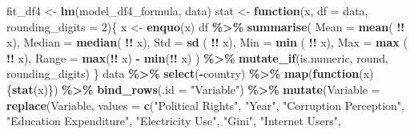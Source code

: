 \documentclass[
  english,
  man,floatsintext]{apa6}
\newenvironment{Shaded}{\begin{snugshade}}{\end{snugshade}}
\newcommand{\ControlFlowTok}[1]{\textcolor[rgb]{0.13,0.29,0.53}{\textbf{#1}}}
\newcommand{\DataTypeTok}[1]{\textcolor[rgb]{0.13,0.29,0.53}{#1}}
\newcommand{\DecValTok}[1]{\textcolor[rgb]{0.00,0.00,0.81}{#1}}
\newcommand{\KeywordTok}[1]{\textcolor[rgb]{0.13,0.29,0.53}{\textbf{#1}}}
\newcommand{\NormalTok}[1]{#1}
\newcommand{\OperatorTok}[1]{\textcolor[rgb]{0.81,0.36,0.00}{\textbf{#1}}}
\newcommand{\StringTok}[1]{\textcolor[rgb]{0.31,0.60,0.02}{#1}}
\begin{document}
\begin{Shaded}
\begin{Highlighting}[]
\NormalTok{fit\_df4 \textless{}{-}}\StringTok{ }\KeywordTok{lm}\NormalTok{(model\_df4\_formula, data)}
\NormalTok{stat \textless{}{-}}\StringTok{ }\ControlFlowTok{function}\NormalTok{(x, }\DataTypeTok{df =}\NormalTok{ data, }\DataTypeTok{rounding\_digits =} \DecValTok{2}\NormalTok{)\{}
\NormalTok{    x \textless{}{-}}\StringTok{ }\KeywordTok{enquo}\NormalTok{(x)}
\NormalTok{    df }\OperatorTok{\%\textgreater{}\%}
\StringTok{      }\KeywordTok{summarise}\NormalTok{(}
                       \DataTypeTok{Mean  =} \KeywordTok{mean}\NormalTok{( }\OperatorTok{!!}\StringTok{ }\NormalTok{x),}
                     \DataTypeTok{Median  =} \KeywordTok{median}\NormalTok{( }\OperatorTok{!!}\StringTok{ }\NormalTok{x),}
                         \DataTypeTok{Std =} \KeywordTok{sd}\NormalTok{  ( }\OperatorTok{!!}\StringTok{ }\NormalTok{x),}
                         \DataTypeTok{Min =} \KeywordTok{min}\NormalTok{ ( }\OperatorTok{!!}\StringTok{ }\NormalTok{x),}
                         \DataTypeTok{Max =} \KeywordTok{max}\NormalTok{ ( }\OperatorTok{!!}\StringTok{ }\NormalTok{x),}
                       \DataTypeTok{Range =} \KeywordTok{max}\NormalTok{(}\OperatorTok{!!}\StringTok{ }\NormalTok{x) }\OperatorTok{{-}}\StringTok{ }\KeywordTok{min}\NormalTok{(}\OperatorTok{!!}\StringTok{ }\NormalTok{x) ) }\OperatorTok{\%\textgreater{}\%}
\StringTok{      }\KeywordTok{mutate\_if}\NormalTok{(is.numeric, round, rounding\_digits)}
\NormalTok{\}}
\NormalTok{data }\OperatorTok{\%\textgreater{}\%}\StringTok{ }
\StringTok{  }\KeywordTok{select}\NormalTok{(}\OperatorTok{{-}}\NormalTok{country) }\OperatorTok{\%\textgreater{}\%}\StringTok{ }
\KeywordTok{map}\NormalTok{(}\ControlFlowTok{function}\NormalTok{(x)\{}\KeywordTok{stat}\NormalTok{(x)\}) }\OperatorTok{\%\textgreater{}\%}\StringTok{ }
\StringTok{  }\KeywordTok{bind\_rows}\NormalTok{(}\DataTypeTok{.id =} \StringTok{"Variable"}\NormalTok{) }\OperatorTok{\%\textgreater{}\%}\StringTok{ }
\StringTok{  }\KeywordTok{mutate}\NormalTok{(}\DataTypeTok{Variable =} \KeywordTok{replace}\NormalTok{(Variable, }
                            \DataTypeTok{values =} \KeywordTok{c}\NormalTok{(}\StringTok{"Political Rights"}\NormalTok{, }\StringTok{"Year"}\NormalTok{, }
                                       \StringTok{"Corruption Perception"}\NormalTok{, }
                                       \StringTok{"Education Expenditure"}\NormalTok{, }
                                       \StringTok{"Electricity Use"}\NormalTok{, }
                                       \StringTok{"Gini"}\NormalTok{, }
                                       \StringTok{"Internet Users"}\NormalTok{,}

\end{Highlighting}
\end{Shaded}
\end{document}

